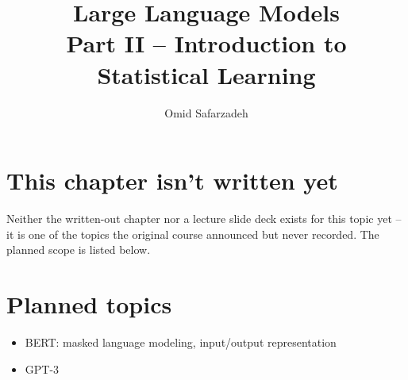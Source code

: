 \documentclass[11pt]{article}
\title{Large Language Models \\ \large Part II -- Introduction to Statistical Learning}
\author{Omid Safarzadeh}
\date{}
\begin{document}
\maketitle

\section*{This chapter isn't written yet}
Neither the written-out chapter nor a lecture slide deck exists for this
topic yet -- it is one of the topics the original course announced but
never recorded. The planned scope is listed below.



\section*{Planned topics}
\begin{itemize}
  \item BERT: masked language modeling, input/output representation
  \item GPT-3
\end{itemize}
\end{document}
